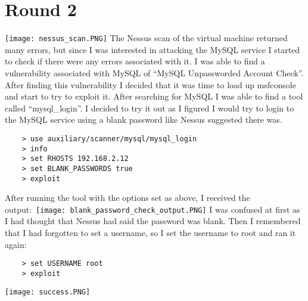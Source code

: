 \documentclass[12pt]{report}
\begin{document}
\section{Round 2}
\texttt{[image: nessus\_scan.PNG]}
The Nessus scan of the virtual machine returned many errors, but since I was interested in attacking the MySQL service I started to check if there were any errors associated with it. I was able to find a vulnerability associated with MySQL of ``MySQL Unpassworded Account Check''.\\
After finding this vulnerability I decided that it was time to load up msfconsole and start to try to exploit it. After searching for MySQL I was able to find a tool called ``mysql\_login''. I decided to try it out as I figured I would try to login to the MySQL service using a blank password like Nessus suggested there was. 
	\begin{verbatim}
	> use auxiliary/scanner/mysql/mysql_login
	> info
	> set RHOSTS 192.168.2.12
	> set BLANK_PASSWORDS true
	> exploit
	\end{verbatim}
After running the tool with the options set as above, I received the output:\
\texttt{[image: blank\_password\_check\_output.PNG]}
\newline
I was confused at first as I had thought that Nessus had said the password was blank. Then I remembered that I had forgotten to set a username, so I set the username to root and ran it again:
	\begin{verbatim}
	> set USERNAME root
	> exploit
	\end{verbatim}
\texttt{[image: success.PNG]}
\newline
\end{document}
